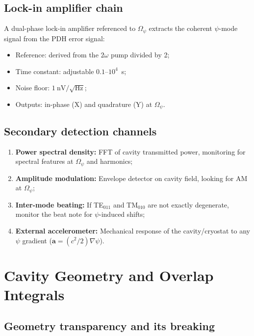 \documentclass[12pt,letterpaper]{article}
\begin{document}
\subsection{Lock-in amplifier chain}

A dual-phase lock-in amplifier referenced to $\Omega_\psi$ extracts
the coherent $\psi$-mode signal from the PDH error signal:
\begin{itemize}[noitemsep]
  \item Reference: derived from the $2\omega$ pump divided by 2;
  \item Time constant: adjustable $0.1$--$10^4$~s;
  \item Noise floor: $1~\text{nV}/\sqrt{\text{Hz}}$;
  \item Outputs: in-phase (X) and quadrature (Y) at $\Omega_\psi$.
\end{itemize}

\subsection{Secondary detection channels}

\begin{enumerate}[noitemsep]
  \item \textbf{Power spectral density:} FFT of cavity transmitted
    power, monitoring for spectral features at $\Omega_\psi$ and
    harmonics;
  \item \textbf{Amplitude modulation:} Envelope detector on cavity
    field, looking for AM at $\Omega_\psi$;
  \item \textbf{Inter-mode beating:} If TE$_{011}$ and TM$_{010}$
    are not exactly degenerate, monitor the beat note for
    $\psi$-induced shifts;
  \item \textbf{External accelerometer:} Mechanical response of the
    cavity/cryostat to any $\psi$ gradient ($\mathbf{a} = (c^2/2)\nabla\psi$).
\end{enumerate}

\section{Cavity Geometry and Overlap Integrals}

\subsection{Geometry transparency and its breaking}
\end{document}
